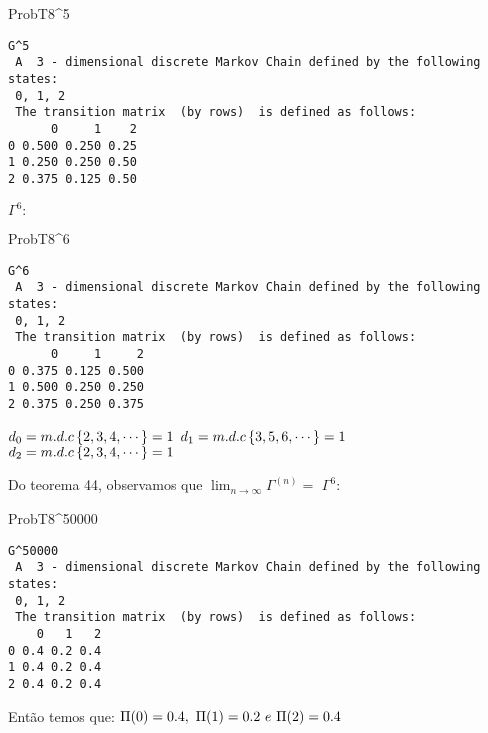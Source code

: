 \documentclass[
]{article}
\newenvironment{Shaded}{\begin{snugshade}}{\end{snugshade}}
\newcommand{\DecValTok}[1]{\textcolor[rgb]{0.00,0.00,0.81}{#1}}
\newcommand{\NormalTok}[1]{#1}
\newcommand{\OperatorTok}[1]{\textcolor[rgb]{0.81,0.36,0.00}{\textbf{#1}}}
\begin{document}
\begin{Shaded}
\begin{Highlighting}[]
\NormalTok{ProbT8}\OperatorTok{^}\DecValTok{5}
\end{Highlighting}
\end{Shaded}

\begin{verbatim}
G^5 
 A  3 - dimensional discrete Markov Chain defined by the following states: 
 0, 1, 2 
 The transition matrix  (by rows)  is defined as follows: 
      0     1    2
0 0.500 0.250 0.25
1 0.250 0.250 0.50
2 0.375 0.125 0.50
\end{verbatim}

\(\Gamma^6:\)

\begin{Shaded}
\begin{Highlighting}[]
\NormalTok{ProbT8}\OperatorTok{^}\DecValTok{6}
\end{Highlighting}
\end{Shaded}

\begin{verbatim}
G^6 
 A  3 - dimensional discrete Markov Chain defined by the following states: 
 0, 1, 2 
 The transition matrix  (by rows)  is defined as follows: 
      0     1     2
0 0.375 0.125 0.500
1 0.500 0.250 0.250
2 0.375 0.250 0.375
\end{verbatim}

\(d_0=m.d.c \left \{ 2,3,4, \cdots \right \}=1\\\)
\(d_1=m.d.c \left \{ 3,5,6, \cdots \right \}=1\\\)
\(d_2=m.d.c \left \{ 2,3,4, \cdots \right \}=1\\\)

Do teorema 44, observamos que
\(\lim_{n\rightarrow \infty }\Gamma^{(n)} =\) \(\Gamma^6:\)

\begin{Shaded}
\begin{Highlighting}[]
\NormalTok{ProbT8}\OperatorTok{^}\DecValTok{50000}
\end{Highlighting}
\end{Shaded}

\begin{verbatim}
G^50000 
 A  3 - dimensional discrete Markov Chain defined by the following states: 
 0, 1, 2 
 The transition matrix  (by rows)  is defined as follows: 
    0   1   2
0 0.4 0.2 0.4
1 0.4 0.2 0.4
2 0.4 0.2 0.4
\end{verbatim}

Então temos que: \(\Pi(0)=0.4,\ \Pi(1)=0.2\ e\ \Pi(2)=0.4\\\)
\end{document}
